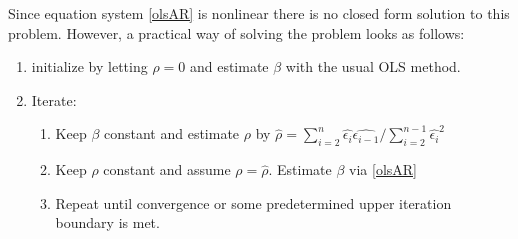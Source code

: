 Since equation system \ref{olsAR} is nonlinear there is no closed form solution to this problem. However, a practical way of solving the problem looks as follows:
\begin{enumerate}
\item initialize by letting $\rho=0$ and estimate $\beta$ with the usual OLS method.
\item Iterate: \begin{enumerate}
\item Keep $\beta$ constant and estimate $\rho$ by $\hat{\rho}=\sum_{i=2}^n \hat{\epsilon_i}\hat{\epsilon_{i-1}}/ \sum_{i=2}^{n-1} \hat{\epsilon_i}^2$
\item Keep $\rho$ constant and assume  $\rho=\hat{\rho}$. Estimate $\beta$ via \ref{olsAR}
\item Repeat until convergence or some predetermined upper iteration boundary is met.
\end{enumerate}
\end{enumerate}
